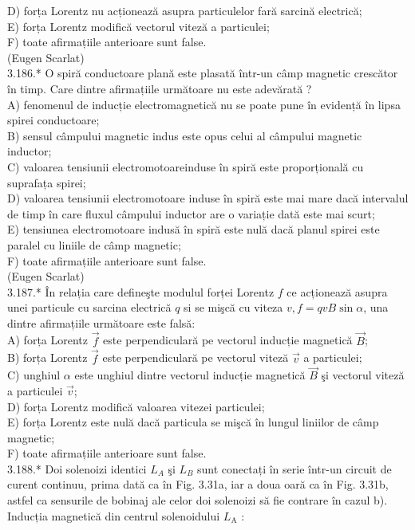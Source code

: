 \documentclass[10pt]{article}
\begin{document}
D) forța Lorentz nu acționează asupra particulelor fară sarcină electrică;\\
E) forța Lorentz modifică vectorul viteză a particulei;\\
F) toate afirmațiile anterioare sunt false.\\
(Eugen Scarlat)\\
3.186.* O spiră conductoare plană este plasată într-un câmp magnetic crescător în timp. Care dintre afirmațiile următoare nu este adevărată ?\\
A) fenomenul de inducție electromagnetică nu se poate pune în evidență în lipsa spirei conductoare;\\
B) sensul câmpului magnetic indus este opus celui al câmpului magnetic inductor;\\
C) valoarea tensiunii electromotoareinduse în spiră este proporțională cu suprafața spirei;\\
D) valoarea tensiunii electromotoare induse în spiră este mai mare dacă intervalul de timp în care fluxul câmpului inductor are o variație dată este mai scurt;\\
E) tensiunea electromotoare indusă în spiră este nulă dacă planul spirei este paralel cu liniile de câmp magnetic;\\
F) toate afirmațiile anterioare sunt false.\\
(Eugen Scarlat)\\
3.187.* În relația care defineşte modulul forței Lorentz $f$ ce acționează asupra unei particule cu sarcina electrică $q$ si se mişcă cu viteza $v, f=q v B \sin \alpha$, una dintre afirmațiile următoare este falsă:\\
A) forța Lorentz $\vec{f}$ este perpendiculară pe vectorul inducție magnetică $\vec{B}$;\\
B) forța Lorentz $\vec{f}$ este perpendiculară pe vectorul viteză $\vec{v}$ a particulei;\\
C) unghiul $\alpha$ este unghiul dintre vectorul inducție magnetică $\vec{B}$ şi vectorul viteză a particulei $\vec{v}$;\\
D) forța Lorentz modifică valoarea vitezei particulei;\\
E) forța Lorentz este nulă dacă particula se mişcă în lungul liniilor de câmp magnetic;\\
F) toate afirmațiile anterioare sunt false.\\
3.188.* Doi solenoizi identici $L_{A}$ şi $L_{B}$ sunt conectați în serie într-un circuit de curent continuu, prima dată ca în Fig. 3.31a, iar a doua oară ca în Fig. 3.31b, astfel ca sensurile de bobinaj ale celor doi solenoizi să fie contrare în cazul b). Inducția magnetică din centrul solenoidului $L_{\mathrm{A}}$ :\\
\end{document}
